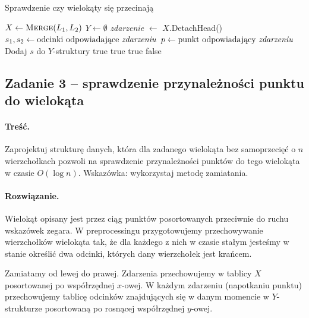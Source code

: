 \begin{algorithm}[H]
	\caption{Sprawdzenie czy wielokąty się przecinają}
	\begin{algorithmic}[1]
		\State $X \gets \textsc{Merge}(L_1, L_2)$ 
		\State $Y \gets \emptyset$
		\State \textit{zdarzenie} $\gets$ $X.$DetachHead()
		\State $s_1, s_2 \gets \text{odcinki odpowiadające \textit{zdarzeniu}}$
		\State $p \gets \text{punkt odpowiadający \textit{zdarzeniu}}$
		\State Dodaj $s$ do $Y$-struktury
		\State \Return true
		\EndIf
		\State \Return true
		\EndIf
		\Else
		\State \Return true
		\EndIf
		\EndIf
		\EndWhile
		\State \Return false
		\EndProcedure
	\end{algorithmic}
	\label{algZadanie7_1}
\end{algorithm}

\subsection{Zadanie 3 -- sprawdzenie przynależności punktu do wielokąta}
\paragraph{Treść.} Zaprojektuj strukturę danych, która dla zadanego wielokąta bez samoprzecięć o 
$n$ wierzchołkach pozwoli
na sprawdzenie przynależności punktów do tego wielokąta w czasie $O(\log n)$.
Wskazówka: wykorzystaj metodę zamiatania.
\paragraph{Rozwiązanie.} 
Wielokąt opisany jest przez ciąg punktów posortowanych przeciwnie do ruchu wskazówek zegara. W preprocessingu przygotowujemy przechowywanie wierzchołków wielokąta tak, że dla każdego z nich w czasie stałym jesteśmy w stanie określić dwa odcinki, których dany wierzchołek jest krańcem.

Zamiatamy od lewej do prawej. Zdarzenia przechowujemy w tablicy $X$ posortowanej po współrzędnej $x$-owej. W każdym zdarzeniu (napotkaniu punktu) przechowujemy tablicę odcinków znajdujących się w danym momencie w $Y$-strukturze posortowaną po rosnącej współrzędnej $y$-owej. 

